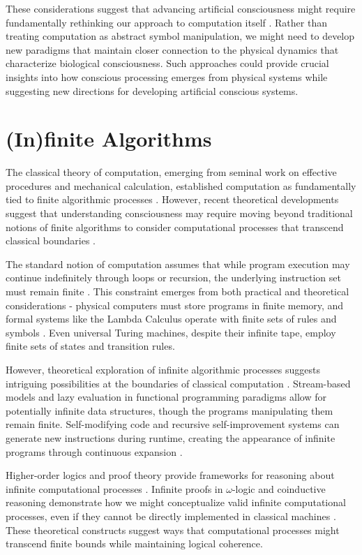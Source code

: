 \begin{refsection}
These considerations suggest that advancing artificial consciousness might require fundamentally rethinking our approach to computation itself \cite{Zauner2020}. Rather than treating computation as abstract symbol manipulation, we might need to develop new paradigms that maintain closer connection to the physical dynamics that characterize biological consciousness. Such approaches could provide crucial insights into how conscious processing emerges from physical systems while suggesting new directions for developing artificial conscious systems.

\section{(In)finite Algorithms}

The classical theory of computation, emerging from seminal work on effective procedures and mechanical calculation, established computation as fundamentally tied to finite algorithmic processes \cite{Davis2000}. However, recent theoretical developments suggest that understanding consciousness may require moving beyond traditional notions of finite algorithms to consider computational processes that transcend classical boundaries \cite{Downey2010}.

The standard notion of computation assumes that while program execution may continue indefinitely through loops or recursion, the underlying instruction set must remain finite \cite{Rogers1987}. This constraint emerges from both practical and theoretical considerations - physical computers must store programs in finite memory, and formal systems like the Lambda Calculus operate with finite sets of rules and symbols \cite{Barendregt1984}. Even universal Turing machines, despite their infinite tape, employ finite sets of states and transition rules.

However, theoretical exploration of infinite algorithmic processes suggests intriguing possibilities at the boundaries of classical computation \cite{Hamkins2014}. Stream-based models and lazy evaluation in functional programming paradigms allow for potentially infinite data structures, though the programs manipulating them remain finite. Self-modifying code and recursive self-improvement systems can generate new instructions during runtime, creating the appearance of infinite programs through continuous expansion \cite{Goldin2006}.

Higher-order logics and proof theory provide frameworks for reasoning about infinite computational processes \cite{Mancosu2008}. Infinite proofs in $\omega$-logic and coinductive reasoning demonstrate how we might conceptualize valid infinite computational processes, even if they cannot be directly implemented in classical machines \cite{Boolos2007}. These theoretical constructs suggest ways that computational processes might transcend finite bounds while maintaining logical coherence.


\end{refsection}
